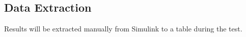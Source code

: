 
\subsection{Data Extraction}
Results will be extracted manually from Simulink to a table during the test.

